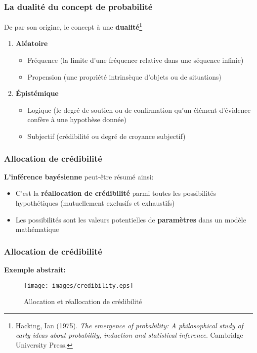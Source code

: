 \documentclass{beamer}
\begin{document}
\begin{frame}
    \frametitle{La dualité du concept de probabilité}

    De par son origine, le concept à une \textbf{dualité}\footnote{
    Hacking, Ian (1975). \emph{The emergence of probability:
    A philosophical study of early ideas about probability,
    induction and statistical inference}. Cambridge University Press.
    }

    \pause

    \vfill

    \begin{enumerate}
      \item \textbf{Aléatoire}
        \begin{itemize}
          \item Fréquence (la limite d'une fréquence relative dans une séquence infinie)
          \item Propension (une propriété intrinsèque d'objets ou de situations)
        \end{itemize}

      \pause

      \item \textbf{Épistémique}
        \begin{itemize}
          \item Logique (le degré de soutien ou de confirmation qu'un élément d'évidence confère à une hypothèse donnée)
          \item Subjectif (crédibilité ou degré de croyance subjectif)
        \end{itemize}
    \end{enumerate}    
\end{frame}


\begin{frame}
    \frametitle{Allocation de crédibilité}
    \textbf{L'inférence bayésienne} peut-être résumé ainsi: \pause
    \begin{itemize}
      \item C'est la \textbf{réallocation de crédibilité} parmi toutes les possibilités hypothétiques
            (mutuellement exclusifs et exhaustifs)
      \pause
      \item Les possibilités sont les valeurs potentielles de \textbf{paramètres} dans un modèle mathématique
    \end{itemize}
\end{frame}


\begin{frame}
    \frametitle{Allocation de crédibilité}
    \textbf{Exemple abstrait:}
    
    \begin{figure}
      \centering
      \texttt{[image: images/credibility.eps]}
      \caption{Allocation et réallocation de crédibilité}
    \end{figure}
\end{frame}
\end{document}
